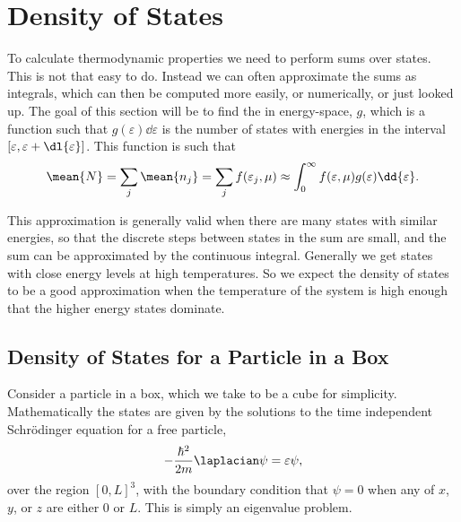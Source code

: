 \documentclass[fleqn]{NotesClass}
\begin{document}
    \chapter{Density of States}
    To calculate thermodynamic properties we need to perform sums over states.
    This is not that easy to do.
    Instead we can often approximate the sums as integrals, which can then be computed more easily, or numerically, or just looked up.
    The goal of this section will be to find the  in energy-space, \(g\), which is a function such that \(g(\varepsilon)\dd{\varepsilon}\) is the number of states with energies in the interval \([\varepsilon, \varepsilon + \dl{\varepsilon}]\).
    This function is such that
    \begin{equation}
        \mean{N} = \sum_j \mean{n_j} = \sum_j f(\varepsilon_j, \mu) \approx \int_{0}^{\infty} f(\varepsilon, \mu) g(\varepsilon) \dd{\varepsilon}.
    \end{equation}
    
    This approximation is generally valid when there are many states with similar energies, so that the discrete steps between states in the sum are small, and the sum can be approximated by the continuous integral.
    Generally we get states with close energy levels at high temperatures.
    So we expect the density of states to be a good approximation when the temperature of the system is high enough that the higher energy states dominate.
    
    \section{Density of States for a Particle in a Box}
    Consider a particle in a box, which we take to be a cube for simplicity.
    Mathematically the states are given by the solutions to the time independent Schrödinger equation for a free particle,
    \begin{equation}
        -\frac{\hbar^2}{2m}\laplacian \psi = \varepsilon\psi,
    \end{equation}
    over the region \([0, L]^3\), with the boundary condition that \(\psi = 0\) when any of \(x\), \(y\), or \(z\) are either \(0\) or \(L\).
    This is simply an eigenvalue problem.
    
\end{document}
